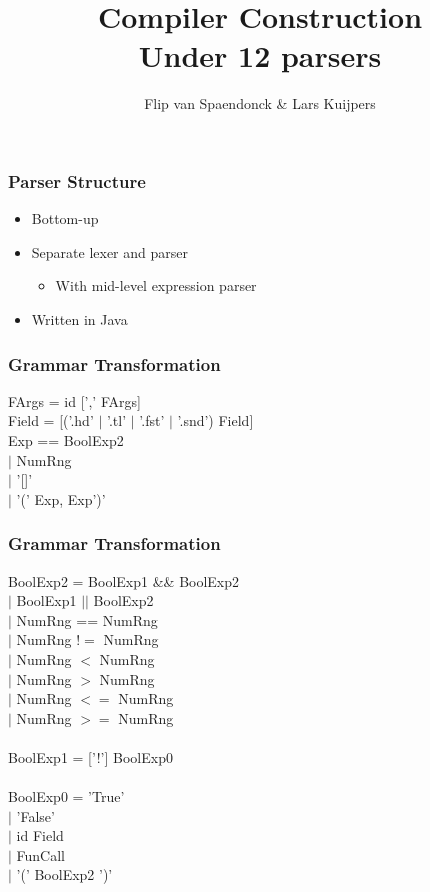 \documentclass{beamer}
\author[Flip \& Lars]{Flip van Spaendonck \& Lars Kuijpers}
\title{Compiler Construction \\ Under 12 parsers}
\begin{document}
\begin{frame}
\titlepage
\end{frame}

\begin{frame}
\frametitle{Parser Structure}
\begin{itemize}
\item Bottom-up
\item Separate lexer and parser
\begin{itemize}
\item With mid-level expression parser
\end{itemize}
\item Written in Java
\end{itemize}
\end{frame}

\begin{frame}
\frametitle{Grammar Transformation}
FArgs = id [',' FArgs]\\
Field = [('.hd' $|$ '.tl' $|$ '.fst' $|$ '.snd') Field]\\
Exp == BoolExp2\\
$|$ NumRng\\
$|$ '[]'\\
$|$ '(' Exp, Exp')'
\end{frame}

\begin{frame}
\frametitle{Grammar Transformation}
BoolExp2 = BoolExp1 \&\& BoolExp2\\
$|$ BoolExp1 $||$ BoolExp2\\
$|$ NumRng == NumRng\\
$|$ NumRng $!=$ NumRng\\
$|$ NumRng $<$ NumRng\\
$|$ NumRng $>$ NumRng\\
$|$ NumRng $<=$ NumRng\\
$|$ NumRng $>=$ NumRng\\
\quad\\
BoolExp1 = ['!'] BoolExp0\\
\quad\\
BoolExp0 = 'True'\\
$|$ 'False'\\
$|$ id Field\\
$|$ FunCall\\
$|$ '(' BoolExp2 ')'
\end{frame}
\end{document}
